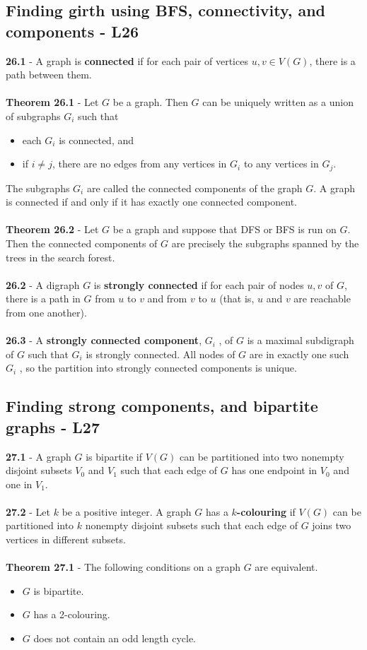 \documentclass[a4paper]{article}
\begin{document}
\subsection*{Finding girth using BFS, connectivity, and components - L26}
\textbf{26.1} - A graph is \textbf{connected} if for each pair of vertices $u, v \in V(G)$, there
is a path between them.\\\\
\textbf{Theorem 26.1} - Let $G$ be a graph. Then $G$ can be uniquely written as a union of
subgraphs $G_i$ such that
\begin{itemize}
    \item each $G_i$ is connected, and
    \item if $i \neq j$, there are no edges from any vertices in $G_i$ to any vertices in $G_j$.
\end{itemize}
The subgraphs $G_i$ are called the connected components of the graph $G$.
A graph is connected if and only if it has exactly one connected component.\\\\
\textbf{Theorem 26.2} - Let $G$ be a graph and suppose that DFS or BFS is run on $G$. Then
the connected components of $G$ are precisely the subgraphs spanned by the trees
in the search forest.\\\\
\textbf{26.2} - A digraph $G$ is \textbf{strongly connected} if for each pair of nodes $u, v$
of $G$, there is a path in $G$ from $u$ to $v$ and from $v$ to $u$ (that is, $u$ and $v$ are reachable
from one another).\\\\
\textbf{26.3} - A \textbf{strongly connected component}, $G_i$ , of $G$ is a maximal subdigraph
of $G$ such that $G_i$ is strongly connected. All nodes of $G$ are in exactly one
such $G_i$ , so the partition into strongly connected components is unique.

\subsection*{Finding strong components, and bipartite graphs - L27}
\textbf{27.1} - A graph $G$ is bipartite if $V(G)$ can be partitioned into two nonempty
disjoint subsets $V_0$ and $V_1$ such that each edge of $G$ has one endpoint in $V_0$ and one
in $V_1$.\\\\
\textbf{27.2} - Let $k$ be a positive integer. A graph $G$ has a \textbf{$k$-colouring} if $V(G)$
can be partitioned into $k$ nonempty disjoint subsets such that each edge of $G$ joins
two vertices in different subsets.\\\\
\textbf{Theorem 27.1} - The following conditions on a graph $G$ are equivalent.
\begin{itemize}
    \item $G$ is bipartite.
    \item $G$ has a 2-colouring.
    \item $G$ does not contain an odd length cycle.
\end{itemize}
\end{document}
